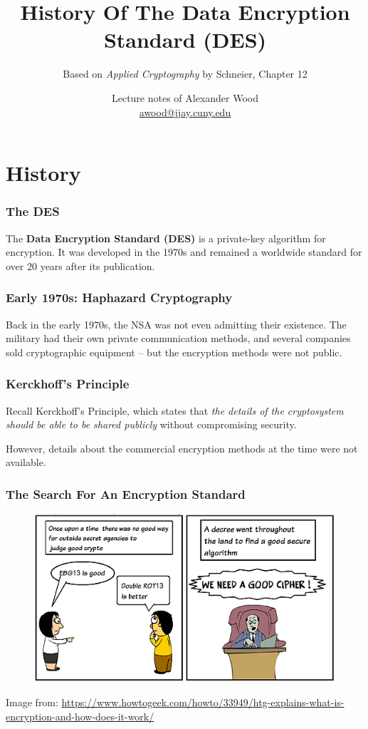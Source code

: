 \documentclass{beamer}
\title[DES]{History Of The Data Encryption Standard (DES)}
\subtitle{Based on \emph{Applied Cryptography} by Schneier, Chapter 12}
\author
{Lecture notes of Alexander Wood \\ \scriptsize \href{mailto:awood@jjay.cuny.edu}{awood@jjay.cuny.edu}}
\institute[JJay]{John Jay College of Criminal Justice}
\date{}
\newcommand{\<}{\langle}
\renewcommand{\>}{\rangle}
\begin{document}

\begin{frame}
  \titlepage
\end{frame}


\section{History}

\begin{frame}
\frametitle{The DES}

The \textbf{Data Encryption Standard (DES)} is a private-key algorithm for encryption. It was developed in the 1970s and remained a worldwide standard for over 20 years after its publication.
\end{frame}


\begin{frame}
\frametitle{Early 1970s: Haphazard Cryptography}

Back in the early 1970s, the NSA was not even admitting their existence. The military had their own private communication methods, and several companies sold cryptographic equipment -- but the encryption methods were not public. 
\end{frame}


\begin{frame}
\frametitle{Kerckhoff's Principle}

Recall Kerckhoff's Principle, which states that \emph{the details of the cryptosystem should be able to be shared publicly} without compromising security.  \newline

However, details about the commercial encryption methods at the time were not available. 
\end{frame}


\begin{frame}
\frametitle{The Search For An Encryption Standard}

\begin{figure}
\includegraphics[scale=.7]{IMG/needacipher}
\end{figure}
{\scriptsize Image from: \url{https://www.howtogeek.com/howto/33949/htg-explains-what-is-encryption-and-how-does-it-work/}}
\end{frame}
\end{document}
